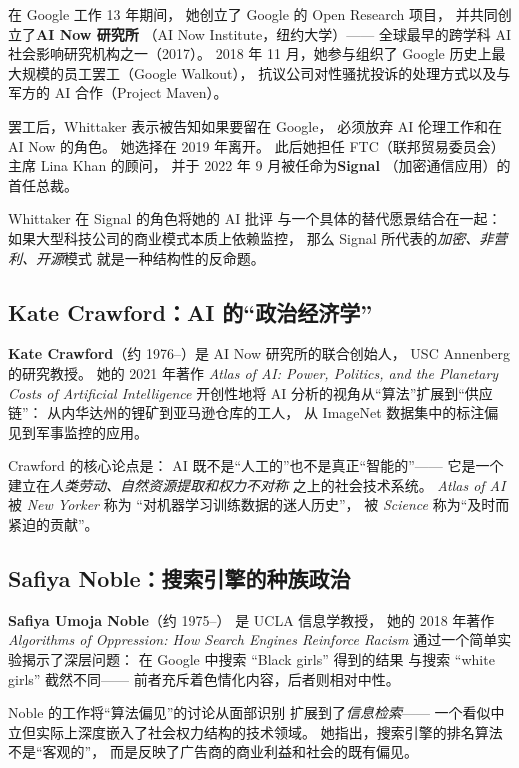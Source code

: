 在 Google 工作 13 年期间，
她创立了 Google 的 Open Research 项目，
并共同创立了\textbf{AI Now 研究所}
（AI Now Institute，纽约大学）——
全球最早的跨学科 AI 社会影响研究机构之一（2017）。
2018 年 11 月，她参与组织了
Google 历史上最大规模的员工罢工（Google Walkout），
抗议公司对性骚扰投诉的处理方式以及与军方的 AI 合作（Project Maven）。

罢工后，Whittaker 表示被告知如果要留在 Google，
必须放弃 AI 伦理工作和在 AI Now 的角色。
她选择在 2019 年离开。
此后她担任 FTC（联邦贸易委员会）主席 Lina Khan 的顾问，
并于 2022 年 9 月被任命为\textbf{Signal}
（加密通信应用）的首任总裁。

Whittaker 在 Signal 的角色将她的 AI 批评
与一个具体的替代愿景结合在一起：
如果大型科技公司的商业模式本质上依赖监控，
那么 Signal 所代表的\emph{加密、非营利、开源}模式
就是一种结构性的反命题。

\subsection{Kate Crawford：AI 的``政治经济学''}

\textbf{Kate Crawford}（约 1976--）是 AI Now 研究所的联合创始人，
USC Annenberg 的研究教授。
她的 2021 年著作 \emph{Atlas of AI: Power, Politics,
and the Planetary Costs of Artificial Intelligence}
开创性地将 AI 分析的视角从``算法''扩展到``供应链''：
从内华达州的锂矿到亚马逊仓库的工人，
从 ImageNet 数据集中的标注偏见到军事监控的应用。

Crawford 的核心论点是：
AI 既不是``人工的''也不是真正``智能的''——
它是一个建立在\emph{人类劳动、自然资源提取和权力不对称}
之上的社会技术系统。
\emph{Atlas of AI} 被 \emph{New Yorker} 称为
``对机器学习训练数据的迷人历史''，
被 \emph{Science} 称为``及时而紧迫的贡献''。

\subsection{Safiya Noble：搜索引擎的种族政治}

\textbf{Safiya Umoja Noble}（约 1975--）
是 UCLA 信息学教授，
她的 2018 年著作 \emph{Algorithms of Oppression:
How Search Engines Reinforce Racism}
通过一个简单实验揭示了深层问题：
在 Google 中搜索 ``Black girls'' 得到的结果
与搜索 ``white girls'' 截然不同——
前者充斥着色情化内容，后者则相对中性。

Noble 的工作将``算法偏见''的讨论从面部识别
扩展到了\emph{信息检索}——
一个看似中立但实际上深度嵌入了社会权力结构的技术领域。
她指出，搜索引擎的排名算法不是``客观的''，
而是反映了广告商的商业利益和社会的既有偏见。

